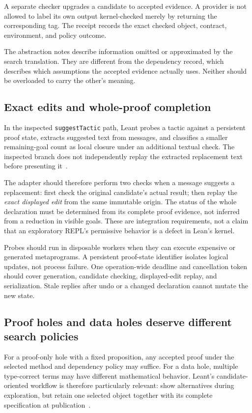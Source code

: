 \documentclass[11pt,a4paper]{article}
\newcommand{\code}[1]{\nolinkurl{#1}}
\theoremstyle{definition}
\begin{document}
A separate checker upgrades a candidate to accepted evidence. A provider is not allowed to label its own output kernel-checked merely by returning the corresponding tag. The receipt records the exact checked object, contract, environment, and policy outcome.

The abstraction notes describe information omitted or approximated by the search translation. They are different from the dependency record, which describes which assumptions the accepted evidence actually uses. Neither should be overloaded to carry the other's meaning.

\subsection{Exact edits and whole-proof completion}
In the inspected \code{suggestTactic} path, Leant probes a tactic against a persistent proof state, extracts suggested text from messages, and classifies a smaller remaining-goal count as local closure under an additional textual check. The inspected branch does not independently replay the extracted replacement text before presenting it~\cite{lmain}.

The adapter should therefore perform two checks when a message suggests a replacement: first check the original candidate's actual result; then replay the \emph{exact displayed edit} from the same immutable origin. The status of the whole declaration must be determined from its complete proof evidence, not inferred from a reduction in visible goals. These are integration requirements, not a claim that an exploratory REPL's permissive behavior is a defect in Lean's kernel.

Probes should run in disposable workers when they can execute expensive or generated metaprograms. A persistent proof-state identifier isolates logical updates, not process failure. One operation-wide deadline and cancellation token should cover generation, candidate checking, displayed-edit replay, and serialization. Stale replies after undo or a changed declaration cannot mutate the new state.

\subsection{Proof holes and data holes deserve different search policies}
For a proof-only hole with a fixed proposition, any accepted proof under the selected method and dependency policy may suffice. For a data hole, multiple type-correct terms may have different mathematical behavior. Leant's candidate-oriented workflow is therefore particularly relevant: show alternatives during exploration, but retain one selected object together with its complete specification at publication~\cite{synB}.
\end{document}
